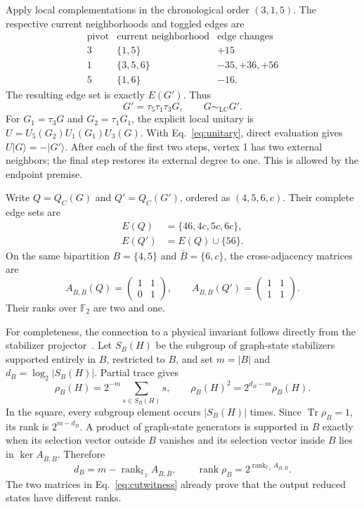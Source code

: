 \documentclass[aps,pra,reprint,amsmath,amssymb,longbibliography]{revtex4-2}
\newcommand{\LC}{\mathrm{LC}}
\newcommand{\rank}{\operatorname{rank}}
\newcommand{\Tr}{\operatorname{Tr}}
\begin{document}
Apply local complementations in the chronological order $(3,1,5)$. The respective current neighborhoods and toggled edges are
\begin{equation}
\begin{array}{c|c|l}
 \text{pivot}&\text{current neighborhood}&\text{edge changes}\\ \hline
 3&\{1,5\}&+15\\
 1&\{3,5,6\}&-35,+36,+56\\
 5&\{1,6\}&-16.
\end{array}\label{eq:word}
\end{equation}
The resulting edge set is exactly $E(G')$. Thus
\begin{equation}
 G'=\tau_5\tau_1\tau_3G,\qquad G\sim_{\LC}G'.\label{eq:lc}
\end{equation}
For $G_1=\tau_3G$ and $G_2=\tau_1G_1$, the explicit local unitary is $U=U_5(G_2)U_1(G_1)U_3(G)$. With Eq.~\eqref{eq:unitary}, direct evaluation gives $U|G\rangle=-|G'\rangle$. After each of the first two steps, vertex 1 has two external neighbors; the final step restores its external degree to one. This is allowed by the endpoint premise.

Write $Q=Q_C(G)$ and $Q'=Q_C(G')$, ordered as $(4,5,6,c)$. Their complete edge sets are
\begin{align}
 E(Q)&=\{46,4c,5c,6c\},\label{eq:quotients}\\
 E(Q')&=E(Q)\cup\{56\}.\nonumber
\end{align}
On the same bipartition $B=\{4,5\}$ and $\bar B=\{6,c\}$, the cross-adjacency matrices are
\begin{equation}
 A_{B,\bar B}(Q)=\begin{pmatrix}1&1\\0&1\end{pmatrix},\qquad
 A_{B,\bar B}(Q')=\begin{pmatrix}1&1\\1&1\end{pmatrix}.
 \label{eq:cutwitness}
\end{equation}
Their ranks over $\mathbb F_2$ are two and one.

For completeness, the connection to a physical invariant follows directly from the stabilizer projector~\cite{Vandre2025}. Let $S_B(H)$ be the subgroup of graph-state stabilizers supported entirely in $B$, restricted to $B$, and set $m=|B|$ and $d_B=\log_2|S_B(H)|$. Partial trace gives
\begin{equation}
 \rho_B(H)=2^{-m}\sum_{s\in S_B(H)}s,
 \qquad \rho_B(H)^2=2^{d_B-m}\rho_B(H).
 \label{eq:projector}
\end{equation}
In the square, every subgroup element occurs $|S_B(H)|$ times. Since $\Tr\rho_B=1$, its rank is $2^{m-d_B}$. A product of graph-state generators is supported in $B$ exactly when its selection vector outside $B$ vanishes and its selection vector inside $B$ lies in $\ker A_{\bar B,B}$. Therefore
\begin{equation}
 d_B=m-\rank_{\mathbb F_2}A_{B,\bar B},\qquad
 \rank\rho_B=2^{\rank_{\mathbb F_2}A_{B,\bar B}}.
 \label{eq:rank}
\end{equation}
The two matrices in Eq.~\eqref{eq:cutwitness} already prove that the output reduced states have different ranks.
\end{document}
